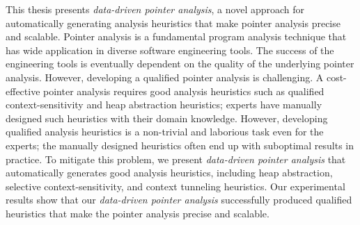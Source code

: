 This thesis presents {\em data-driven pointer analysis}, a novel approach for automatically generating analysis heuristics that make pointer analysis precise and scalable. 
Pointer analysis is a fundamental program analysis technique that has wide application in diverse software engineering tools. The success of the engineering tools is eventually dependent on the quality of the underlying pointer analysis.
However, developing a qualified pointer analysis is challenging.
A cost-effective pointer analysis requires good analysis heuristics such as qualified context-sensitivity and heap abstraction heuristics; 
experts have manually designed such heuristics with their domain knowledge.
However, developing qualified analysis heuristics is a non-trivial and laborious task even for the experts; the manually designed heuristics often end up with suboptimal results in practice.
To mitigate this problem, we present {\em data-driven pointer analysis} that automatically generates good analysis heuristics, including heap abstraction, selective context-sensitivity, and context tunneling heuristics.
Our experimental results show that our {\em data-driven pointer analysis} successfully produced qualified heuristics that make the pointer analysis precise and scalable.










